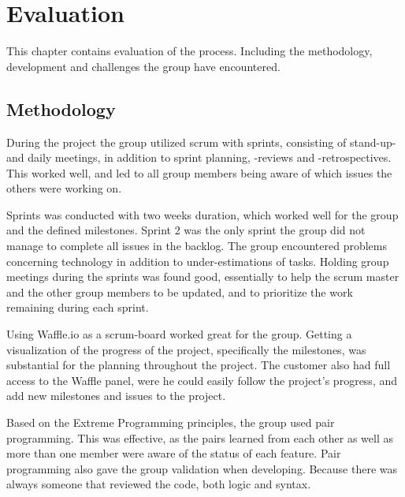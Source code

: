 
\chapter{Evaluation}
\label{evaluationProcess}
This chapter contains evaluation of the process. Including the methodology, development and challenges the group have encountered.

\section{Methodology}
\label{evaluationMethodology}
During the project the group utilized scrum with sprints, consisting of stand-up- and daily meetings, in addition to sprint planning, -reviews and -retrospectives. This worked well, and led to all group members being aware of which issues the others were working on. 

Sprints was conducted with two weeks duration, which worked well for the group and the defined milestones. Sprint 2 was the only sprint the group did not manage to complete all issues in the backlog. The group encountered problems concerning technology in addition to under-estimations of tasks. Holding group meetings during the sprints was found good, essentially to help the scrum master and the other group members to be updated, and to prioritize the work remaining during each sprint. 

Using Waffle.io as a scrum-board worked great for the group. Getting a visualization of the progress of the project, specifically the milestones, was substantial for the planning throughout the project. The customer also had full access to the Waffle panel, were he could easily follow the project's progress, and add new milestones and issues to the project.

Based on the Extreme Programming principles, the group used pair programming. This was effective, as the pairs learned from each other as well as more than one member were aware of the status of each feature. Pair programming also gave the group validation when developing. Because there was always someone that reviewed the code, both logic and syntax.

